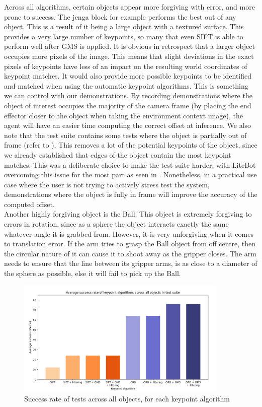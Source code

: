 Across all algorithms, certain objects appear more forgiving with error, and more prone to success. The jenga block for example performs the best out of any object. This is a result of it being a large object with a textured surface. This provides a very large number of keypoints, so many that even SIFT is able to perform well after GMS is applied. It is obvious in retrospect that a larger object occupies more pixels of the image. This means that slight deviations in the exact pixels of keypoints have less of an impact on the resulting world coordinates of keypoint matches. It would also provide more possible keypoints to be identified and matched when using the automatic keypoint algorithms. This is something we can control with our demonstrations. By recording demonstrations where the object of interest occupies the majority of the camera frame (by placing the end effector closer to the object when taking the environment context image), the agent will have an easier time computing the correct offset at inference. We also note that the test suite contains some tests where the object is partially out of frame (refer to ). This removes a lot of the potential keypoints of the object, since we already established that edges of the object contain the most keypoint matches. This was a deliberate choice to make the test suite harder, with LiteBot overcoming this issue for the most part as seen in . Nonetheless, in a practical use case where the user is not trying to actively stress test the system, demonstrations where the object is fully in frame will improve the accuracy of the computed offset.\\

Another highly forgiving object is the Ball. This object is extremely forgiving to errors in rotation, since as a sphere the object interacts exactly the same whatever angle it is grabbed from. However, it is very unforgiving when it comes to translation error. If the arm tries to grasp the Ball object from off centre, then the circular nature of it can cause it to shoot away as the gripper closes. The arm needs to ensure that the line between its gripper arms, is as close to a diameter of the sphere as possible, else it will fail to pick up the Ball.

\begin{figure}[h]
    \centering
    \includegraphics[width=0.9\textwidth]{figures/barchart.png}
    \caption{Success rate of tests across all objects, for each keypoint algorithm}
    \label{fig:barchart}
\end{figure}


